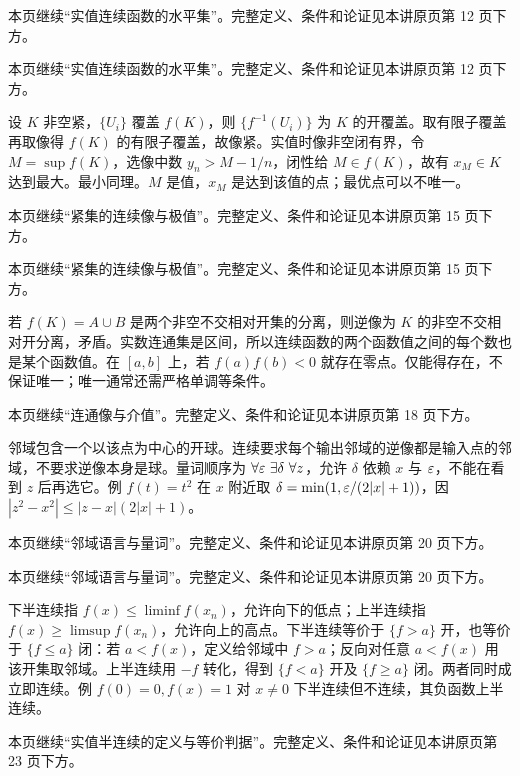 本页继续“实值连续函数的水平集”。完整定义、条件和论证见本讲原页第 12 页下方。

本页继续“实值连续函数的水平集”。完整定义、条件和论证见本讲原页第 12 页下方。

设 $K$ 非空紧，$\{U_i\}$ 覆盖 $f(K)$，则 $\{f^{-1}(U_i)\}$ 为 $K$ 的开覆盖。取有限子覆盖再取像得 $f(K)$ 的有限子覆盖，故像紧。实值时像非空闭有界，令 $M=\sup f(K)$，选像中数 $y_n>M-1/n$，闭性给 $M\in f(K)$，故有 $x_M\in K$ 达到最大。最小同理。$M$ 是值，$x_M$ 是达到该值的点；最优点可以不唯一。

本页继续“紧集的连续像与极值”。完整定义、条件和论证见本讲原页第 15 页下方。

本页继续“紧集的连续像与极值”。完整定义、条件和论证见本讲原页第 15 页下方。

若 $f(K)=A\cup B$ 是两个非空不交相对开集的分离，则逆像为 $K$ 的非空不交相对开分离，矛盾。实数连通集是区间，所以连续函数的两个函数值之间的每个数也是某个函数值。在 $[a,b]$ 上，若 $f(a)f(b)<0$ 就存在零点。仅能得存在，不保证唯一；唯一通常还需严格单调等条件。

本页继续“连通像与介值”。完整定义、条件和论证见本讲原页第 18 页下方。

邻域包含一个以该点为中心的开球。连续要求每个输出邻域的逆像都是输入点的邻域，不要求逆像本身是球。量词顺序为 $\forall\varepsilon\ \exists\delta\ \forall z$，允许 $\delta$ 依赖 $x$ 与 $\varepsilon$，不能在看到 $z$ 后再选它。例 $f(t)=t^2$ 在 $x$ 附近取 $\delta=\min(1,\varepsilon/(2|x|+1))$，因 $|z^2-x^2|\le|z-x|(2|x|+1)$。

本页继续“邻域语言与量词”。完整定义、条件和论证见本讲原页第 20 页下方。

本页继续“邻域语言与量词”。完整定义、条件和论证见本讲原页第 20 页下方。

下半连续指 $f(x)\le\liminf f(x_n)$，允许向下的低点；上半连续指 $f(x)\ge\limsup f(x_n)$，允许向上的高点。下半连续等价于 $\{f>a\}$ 开，也等价于 $\{f\le a\}$ 闭：若 $a<f(x)$，定义给邻域中 $f>a$；反向对任意 $a<f(x)$ 用该开集取邻域。上半连续用 $-f$ 转化，得到 $\{f<a\}$ 开及 $\{f\ge a\}$ 闭。两者同时成立即连续。例 $f(0)=0,f(x)=1$ 对 $x\ne0$ 下半连续但不连续，其负函数上半连续。

本页继续“实值半连续的定义与等价判据”。完整定义、条件和论证见本讲原页第 23 页下方。

